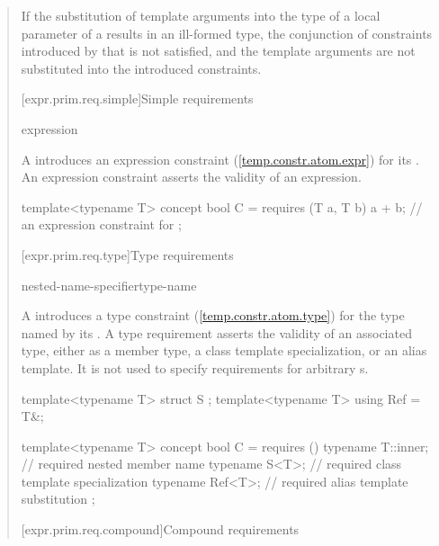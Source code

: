 \begin{quote}
\pnum If the substitution of template arguments into the type of
a local parameter of a 
results in an ill-formed type, the conjunction of constraints introduced 
by that  is not satisfied, and the
template arguments are not substituted into the introduced constraints.


[expr.prim.req.simple]{Simple requirements}

\begin{bnf}
    expression \terminal{;}
\end{bnf}

\pnum
A  introduces an expression 
constraint (\ref{temp.constr.atom.expr}) for its 
.
\enternote
An expression constraint asserts the validity of an expression.
\exitnote

\enterexample
\begin{codeblock}
template<typename T> concept bool C =
  requires (T a, T b) {
    a + b;  // an expression constraint for 
  };
\end{codeblock}
\exitexample


[expr.prim.req.type]{Type requirements}

\begin{bnf}
\br
     nested-name-specifier\opt type-name \terminal{;}
\end{bnf}

\pnum
A  introduces a type 
constraint (\ref{temp.constr.atom.type}) for the type named by its
.
%
\enternote
A type requirement asserts the validity of an associated
type, either as a member type, a class template specialization,
or an alias template. It is not used to specify requirements for
arbitrary s.
\exitnote
%
\enterexample
\begin{codeblock}
template<typename T> struct S { };
template<typename T> using Ref = T&;

template<typename T> concept bool C =
  requires () {
    typename T::inner; // required nested member name
    typename S<T>;     // required class template specialization
    typename Ref<T>;   // required alias template substitution
  };
\end{codeblock}
\exitexample


[expr.prim.req.compound]{Compound requirements}
      

\end{quote}
